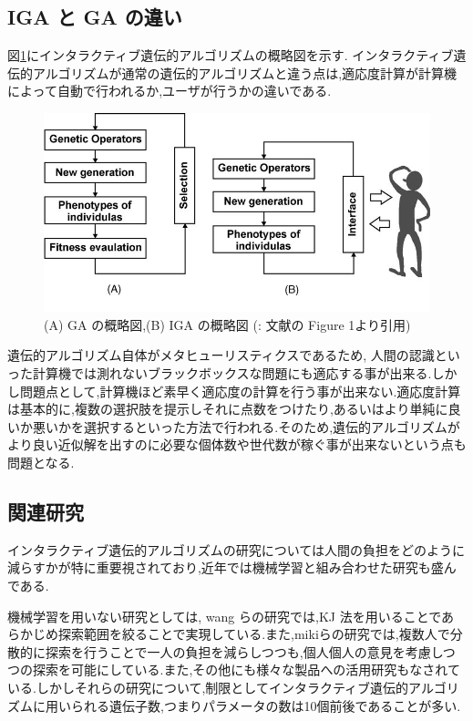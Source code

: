 \subsection{IGA と GA の違い}
図\ref{fig:iGAOverView}にインタラクティブ遺伝的アルゴリズムの概略図を示す.
インタラクティブ遺伝的アルゴリズムが通常の遺伝的アルゴリズムと違う点は,適応度計算が計算機によって自動で行われるか,ユーザが行うかの違いである.
\begin{figure}[h]
	\begin{center}
		\includegraphics[scale=0.5]{./imgs/iGA_overview2.png}
		\caption[IGA の概略図]{(A) GA の概略図,(B) IGA の概略図 (: 文献\cite{MADAR20051591}の Figure 1より引用\label{fig:iGAOverView})}
	\end{center}
\end{figure}

遺伝的アルゴリズム自体がメタヒューリスティクスであるため,
人間の認識といった計算機では測れないブラックボックスな問題にも適応する事が出来る.しかし問題点として,計算機ほど素早く適応度の計算を行う事が出来ない.適応度計算は基本的に,複数の選択肢を提示しそれに点数をつけたり,あるいはより単純に良いか悪いかを選択するといった方法で行われる.そのため,遺伝的アルゴリズムがより良い近似解を出すのに必要な個体数や世代数が稼ぐ事が出来ないという点も問題となる.


\subsection{関連研究}
インタラクティブ遺伝的アルゴリズムの研究については人間の負担をどのように減らすかが特に重要視されており,近年では機械学習と組み合わせた研究\cite{gypa2023propeller, li2023quantification}も盛んである.


機械学習を用いない研究としては, wang らの研究\cite{wang2020method}では,KJ 法を用いることであらかじめ探索範囲を絞ることで実現している.また,mikiらの研究\cite{miki2006global}では,複数人で分散的に探索を行うことで一人の負担を減らしつつも,個人個人の意見を考慮しつつの探索を可能にしている.また,その他にも様々な製品\cite{dong2008tile, 竹之内宏2022対話型人工蜂コロニーアルゴリズムを用いたランニングシューズデザインシステム}への活用研究もなされている.しかしそれらの研究について,制限としてインタラクティブ遺伝的アルゴリズムに用いられる遺伝子数,つまりパラメータの数は10個前後であることが多い.

